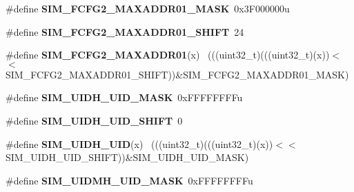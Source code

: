 \begin{DoxyCompactItemize}
\item 
\hypertarget{group___s_i_m___register___masks_gad0f069302bccc7e6a5fea2f0513e6133}{}\#define {\bfseries S\+I\+M\+\_\+\+F\+C\+F\+G2\+\_\+\+M\+A\+X\+A\+D\+D\+R01\+\_\+\+M\+A\+S\+K}~0x3\+F000000u\label{group___s_i_m___register___masks_gad0f069302bccc7e6a5fea2f0513e6133}

\item 
\hypertarget{group___s_i_m___register___masks_gaa0ba945fdb3a74da484b0672678ceabb}{}\#define {\bfseries S\+I\+M\+\_\+\+F\+C\+F\+G2\+\_\+\+M\+A\+X\+A\+D\+D\+R01\+\_\+\+S\+H\+I\+F\+T}~24\label{group___s_i_m___register___masks_gaa0ba945fdb3a74da484b0672678ceabb}

\item 
\hypertarget{group___s_i_m___register___masks_gaadb42ccd44eee659f33465b554192b27}{}\#define {\bfseries S\+I\+M\+\_\+\+F\+C\+F\+G2\+\_\+\+M\+A\+X\+A\+D\+D\+R01}(x)                                  ~(((uint32\+\_\+t)(((uint32\+\_\+t)(x))$<$$<$S\+I\+M\+\_\+\+F\+C\+F\+G2\+\_\+\+M\+A\+X\+A\+D\+D\+R01\+\_\+\+S\+H\+I\+F\+T))\&S\+I\+M\+\_\+\+F\+C\+F\+G2\+\_\+\+M\+A\+X\+A\+D\+D\+R01\+\_\+\+M\+A\+S\+K)\label{group___s_i_m___register___masks_gaadb42ccd44eee659f33465b554192b27}

\item 
\hypertarget{group___s_i_m___register___masks_ga313fa2a8e328043458a9ec1e3125c75f}{}\#define {\bfseries S\+I\+M\+\_\+\+U\+I\+D\+H\+\_\+\+U\+I\+D\+\_\+\+M\+A\+S\+K}~0x\+F\+F\+F\+F\+F\+F\+F\+Fu\label{group___s_i_m___register___masks_ga313fa2a8e328043458a9ec1e3125c75f}

\item 
\hypertarget{group___s_i_m___register___masks_ga2984b4c4d6bb4339997aee03c8a263b1}{}\#define {\bfseries S\+I\+M\+\_\+\+U\+I\+D\+H\+\_\+\+U\+I\+D\+\_\+\+S\+H\+I\+F\+T}~0\label{group___s_i_m___register___masks_ga2984b4c4d6bb4339997aee03c8a263b1}

\item 
\hypertarget{group___s_i_m___register___masks_ga1f030a932e2f9157c66511f34099f61a}{}\#define {\bfseries S\+I\+M\+\_\+\+U\+I\+D\+H\+\_\+\+U\+I\+D}(x)                                                ~(((uint32\+\_\+t)(((uint32\+\_\+t)(x))$<$$<$S\+I\+M\+\_\+\+U\+I\+D\+H\+\_\+\+U\+I\+D\+\_\+\+S\+H\+I\+F\+T))\&S\+I\+M\+\_\+\+U\+I\+D\+H\+\_\+\+U\+I\+D\+\_\+\+M\+A\+S\+K)\label{group___s_i_m___register___masks_ga1f030a932e2f9157c66511f34099f61a}

\item 
\hypertarget{group___s_i_m___register___masks_ga38dffcb27b09a015e2f2e7812d42477c}{}\#define {\bfseries S\+I\+M\+\_\+\+U\+I\+D\+M\+H\+\_\+\+U\+I\+D\+\_\+\+M\+A\+S\+K}~0x\+F\+F\+F\+F\+F\+F\+F\+Fu\label{group___s_i_m___register___masks_ga38dffcb27b09a015e2f2e7812d42477c}


\end{DoxyCompactItemize}
